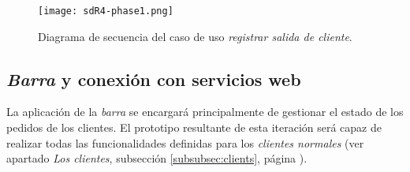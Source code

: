   \begin{sidewaysfigure}[!h]
    \begin{center}
      \texttt{[image: sdR4-phase1.png]}
      \caption{Diagrama de secuencia del caso de uso \emph{registrar salida
      de cliente}.}
      \label{fig:sdR4-phase1}
    \end{center}
  \end{sidewaysfigure}


\subsection{\emph{Barra} y conexión con servicios web}
La aplicación de la \emph{barra} se encargará principalmente de gestionar el
estado de los pedidos de los clientes. El prototipo resultante de esta
iteración será capaz de realizar todas las funcionalidades definidas para
los \emph{clientes normales} (ver apartado \emph{Los clientes},
subsección \ref{subsubsec:clients}, página \pageref{subsubsec:clients}).

